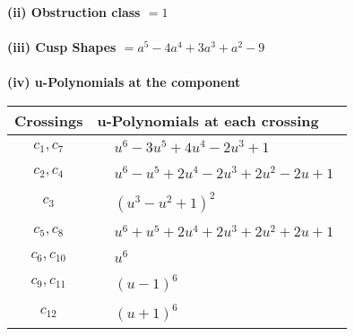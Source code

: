 \documentclass[1p]{elsarticle_modified}
\theoremstyle{definition}
\begin{document}
\flushleft \textbf{(ii) Obstruction class $= 1$}\\~\\
\flushleft \textbf{(iii) Cusp Shapes $= a^5-4 a^4+3 a^3+a^2-9$}\\~\\
\newpage\renewcommand{\arraystretch}{1}
\flushleft \textbf{(iv) u-Polynomials at the component}\newline \\
\begin{tabular}{m{50pt}|m{274pt}}
Crossings & \hspace{64pt}u-Polynomials at each crossing \\
\hline $$\begin{aligned}c_{1},c_{7}\end{aligned}$$&$\begin{aligned}
&u^6-3 u^5+4 u^4-2 u^3+1
\end{aligned}$\\
\hline $$\begin{aligned}c_{2},c_{4}\end{aligned}$$&$\begin{aligned}
&u^6- u^5+2 u^4-2 u^3+2 u^2-2 u+1
\end{aligned}$\\
\hline $$\begin{aligned}c_{3}\end{aligned}$$&$\begin{aligned}
&(u^3- u^2+1)^2
\end{aligned}$\\
\hline $$\begin{aligned}c_{5},c_{8}\end{aligned}$$&$\begin{aligned}
&u^6+u^5+2 u^4+2 u^3+2 u^2+2 u+1
\end{aligned}$\\
\hline $$\begin{aligned}c_{6},c_{10}\end{aligned}$$&$\begin{aligned}
&u^6
\end{aligned}$\\
\hline $$\begin{aligned}c_{9},c_{11}\end{aligned}$$&$\begin{aligned}
&(u-1)^6
\end{aligned}$\\
\hline $$\begin{aligned}c_{12}\end{aligned}$$&$\begin{aligned}
&(u+1)^6
\end{aligned}$\\
\hline
\end{tabular}\\~\\
\end{document}
